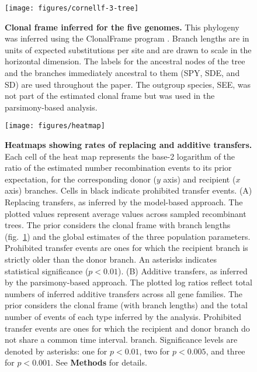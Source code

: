 \documentclass[12pt]{article}
\begin{document}
\begin{figure}%
\noindent \begin{centering}
\texttt{[image: figures/cornellf-3-tree]}
\par\end{centering}
\caption{ {\bf Clonal frame inferred for the five genomes.}  This phylogeny
  was inferred using the ClonalFrame program \citep{Didelot2007}.  Branch
  lengths are in units of expected substitutions per site and are drawn to
  scale in the horizontal dimension.  The labels for the ancestral nodes of
  the tree and the branches immediately ancestral to them (SPY, SDE, and
  SD) are used throughout the paper.  The outgroup species, SEE, was not
  part of the estimated clonal frame but was used in the parsimony-based
  analysis.}
\label{fig:tree5}
\end{figure}



\begin{figure}
\begin{center}
\texttt{[image: figures/heatmap]}
\caption{\label{fig:Heatmap-of-transfers}
{\bf Heatmaps showing rates of replacing and additive transfers.}
Each cell of the heat map represents the base-2 logarithm 
of the ratio of the estimated number recombination events to its prior
expectation, for the corresponding donor ($y$ axis) and recipient ($x$
axis) branches.  
Cells in black indicate prohibited transfer events.
%
(A) Replacing transfers, as inferred by the model-based approach. The
plotted values represent 
average values across sampled recombinant
trees. The prior considers the clonal frame with branch lengths (fig.\
\ref{fig:tree5}) and the 
global estimates of the three population parameters. Prohibited transfer events
are ones for which the recipient branch is strictly older than the donor
branch. An asterisks indicates statistical significance ($p<0.01$).
%
(B) Additive transfers, as inferred by the parsimony-based
approach. The plotted log ratios reflect
total numbers of inferred additive transfers across all gene families.
The prior considers the clonal frame (with branch lengths) and the total number
of events of each type inferred by the analysis. Prohibited transfer events are
ones for which the recipient and donor branch do not share a common time
interval.
branch. Significance levels are denoted by asterisks: one for $p<0.01$, two for
$p<0.005$, and three for $p<0.001$.  See {\bf Methods} for details.}
\end{center}
\end{figure}
\clearpage{}
\end{document}
